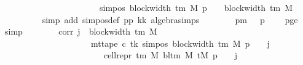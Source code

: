 \begin{isabellebody}
\ \ \ \ \ \ \ \ \ \ \ \ \ \ \ \ \ \ \ \ \ \ {\isacharequal}{\kern0pt}\ sim{\isacharunderscore}{\kern0pt}pos\ {\isacharparenleft}{\kern0pt}block{\isacharunderscore}{\kern0pt}width\ {\isacharparenleft}{\kern0pt}{\isasymGamma}{\isacharunderscore}{\kern0pt}tm\ M{\isacharparenright}{\kern0pt}{\isacharparenright}{\kern0pt}\ {\isacharparenleft}{\kern0pt}p\ {\isacharminus}{\kern0pt}\ {}{\isacharparenright}{\kern0pt}\ {\isacharplus}{\kern0pt}\ {\isacharparenleft}{\kern0pt}block{\isacharunderscore}{\kern0pt}width\ {\isacharparenleft}{\kern0pt}{\isasymGamma}{\isacharunderscore}{\kern0pt}tm\ M{\isacharparenright}{\kern0pt}\ {\isacharminus}{\kern0pt}\ {}{\isacharparenright}{\kern0pt}{\isachardoublequoteclose}\isanewline
\ \ \ \ \ \ \ \ \isamarkupfalse%
\ {\isacharparenleft}{\kern0pt}simp\ add{\isacharcolon}{\kern0pt}\ sim{\isacharunderscore}{\kern0pt}pos{\isacharunderscore}{\kern0pt}def\ pp\ kk\ algebra{\isacharunderscore}{\kern0pt}simps{\isacharparenright}{\kern0pt}\isanewline
\ \ \ \ \ \ \isamarkupfalse%
\ pm{}{\isacharcolon}{\kern0pt}\ {\isachardoublequoteopen}{}\ {\isasymle}\ p\ {\isacharminus}{\kern0pt}\ {}{\isachardoublequoteclose}\ \isamarkupfalse%
\ pge{}\ \isamarkupfalse%
\ simp\isanewline
\ \ \ \ \ \ \isamarkupfalse%
\ corr{}{\isacharcolon}{\kern0pt}\ {\isachardoublequoteopen}{\isasymforall}j\ {\isacharless}{\kern0pt}\ block{\isacharunderscore}{\kern0pt}width\ {\isacharparenleft}{\kern0pt}{\isasymGamma}{\isacharunderscore}{\kern0pt}tm\ M{\isacharparenright}{\kern0pt}{\isachardot}{\kern0pt}\isanewline
\ \ \ \ \ \ \ \ \ \ \ \ \ \ \ \ \ \ \ \ \ mt{\isacharunderscore}{\kern0pt}tape\ c{\isacharprime}{\kern0pt}\ tk\ {\isacharparenleft}{\kern0pt}sim{\isacharunderscore}{\kern0pt}pos\ {\isacharparenleft}{\kern0pt}block{\isacharunderscore}{\kern0pt}width\ {\isacharparenleft}{\kern0pt}{\isasymGamma}{\isacharunderscore}{\kern0pt}tm\ M{\isacharparenright}{\kern0pt}{\isacharparenright}{\kern0pt}\ {\isacharparenleft}{\kern0pt}p\ {\isacharminus}{\kern0pt}\ {}{\isacharparenright}{\kern0pt}\ {\isacharplus}{\kern0pt}\ j{\isacharparenright}{\kern0pt}\isanewline
\ \ \ \ \ \ \ \ \ \ \ \ \ \ \ \ \ \ \ \ \ \ \ {\isacharequal}{\kern0pt}\ cell{\isacharunderscore}{\kern0pt}repr\ {\isacharparenleft}{\kern0pt}{\isasymGamma}{\isacharunderscore}{\kern0pt}tm\ M{\isacharparenright}{\kern0pt}\ {\isacharparenleft}{\kern0pt}bl{\isacharunderscore}{\kern0pt}tm\ M{\isacharparenright}{\kern0pt}\ {\isacharparenleft}{\kern0pt}tM\ {\isacharparenleft}{\kern0pt}p\ {\isacharminus}{\kern0pt}\ {}{\isacharparenright}{\kern0pt}{\isacharparenright}{\kern0pt}\ {\isacharbang}{\kern0pt}\ j{\isachardoublequoteclose}\isanewline

\end{isabellebody}

